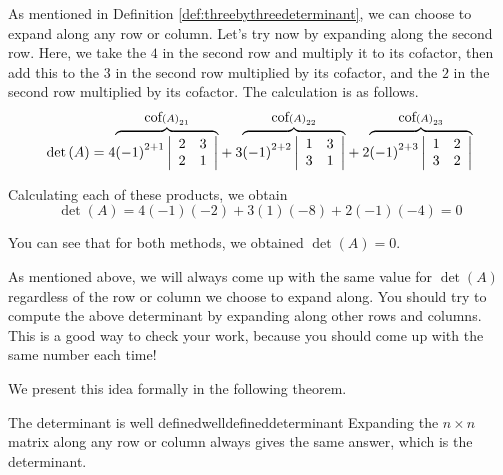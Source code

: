 \begin{solution}
As mentioned in Definition \ref{def:threebythreedeterminant}, we can choose to 
expand along any row or column. Let's try now by expanding along the second row.
Here, we take the $4$ in the second row and multiply it to its cofactor, then 
add this to the $3$ in the second row multiplied by its cofactor, and the $2$ in the 
second row multiplied by its cofactor. The calculation is as follows. 
\begin{equation*}
\det \left(A\right)
=
4 \overset{\mbox{cof}\left( A\right) _{21}}{\overbrace{\left( -1\right)
^{2+1}\left|
\begin{array}{rr}
2 & 3 \\
2 & 1
\end{array}
\right| }}+3 \overset{\mbox{cof}\left( A\right) _{22}}{\overbrace{\left(
-1\right) ^{2+2}\left|
\begin{array}{rr}
1 & 3 \\
3 & 1
\end{array}
\right| }}+2 \overset{\mbox{cof}\left( A\right) _{23}}{\overbrace{\left(
-1\right) ^{2+3}\left|
\begin{array}{rr}
1 & 2 \\
3 & 2
\end{array}
\right| }}
\end{equation*}

Calculating each of these products, we obtain
\begin{equation*}
\det \left(A\right)
=
4\left(-1\right)\left(-2\right) 
+
3\left(1\right)\left(-8\right) 
+
2 \left(-1\right)\left(-4\right)
=
0
\end{equation*}

You can see that for both methods, we obtained $\det \left(A\right) = 0$. 
\end{solution}

As mentioned above, we will always come up with the same value for $\det \left(A\right)$ regardless of the row or column 
we choose to expand along. You should try to compute the above determinant by expanding along other
rows and columns. This is a good way to check your work, because you should come up 
with the same number each time!  

We present this idea formally in the following theorem.

\begin{theorem}{The determinant is well defined}{welldefineddeterminant}
Expanding the $n\times n$ matrix along any row or column always gives the
same answer, which is the determinant.
\end{theorem}

